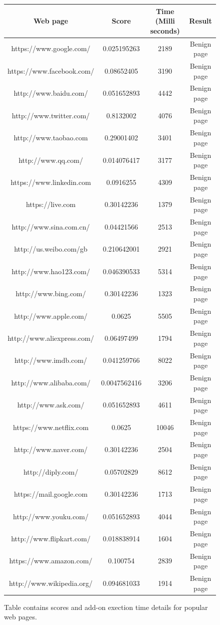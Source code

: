 \begin{figure}[h]
  \centering
  \begin{tabular}{|c|c|c|c|} 
  \midrule
 Web page& Score& Time (Milli seconds) & Result\\
  \midrule
https://www.google.com/&0.025195263&2189&Benign page\\
\midrule
https://www.facebook.com/&0.08652405&3190&Benign page\\
\midrule
http://www.baidu.com/&0.051652893&4442&Benign page\\
\midrule
http://www.twitter.com/&0.8132002&4076&Benign page\\
\midrule
http://www.taobao.com&0.29001402&3401&Benign page\\
\midrule
http://www.qq.com/&0.014076417&3177&Benign page\\
\midrule
https://www.linkedin.com&0.0916255&4309&Benign page\\
\midrule
https://live.com&0.30142236&1379&Benign page\\
\midrule
http://www.sina.com.cn/&0.04421566&2513&Benign page\\
\midrule
http://us.weibo.com/gb&0.210642001&2921&Benign page\\
\midrule
http://www.hao123.com/&0.046390533&5314&Benign page\\
\midrule
http://www.bing.com/&0.30142236&1323&Benign page\\
\midrule
http://www.apple.com/&0.0625&5505&Benign page\\
\midrule
http://www.aliexpress.com/&0.06497499&1794&Benign page\\
\midrule
http://www.imdb.com/&0.041259766&8022&Benign page\\
\midrule
http://www.alibaba.com/&0.0047562416&3206&Benign page\\
\midrule
http://www.ask.com/&0.051652893&4611&Benign page\\
\midrule
https://www.netflix.com&0.0625&10046&Benign page\\
\midrule
http://www.naver.com/&0.30142236&2504&Benign page\\
\midrule
http://diply.com/&0.05702829&8612&Benign page\\
\midrule
https://mail.google.com&0.30142236&1713&Benign page\\
\midrule
http://www.youku.com/&0.051652893&4044&Benign page\\
\midrule
http://www.flipkart.com/&0.018838914&1604&Benign page\\
\midrule
https://www.amazon.com/&0.100754&2839&Benign page\\
\midrule
http://www.wikipedia.org/&0.094681033&1914&Benign page\\
\midrule
\end{tabular}
    \caption[Scores table for popular web pages]{Table contains scores and add-on exection time details for popular web pages. }
    \label{fig:scoresummarytablep}
\end{figure}

